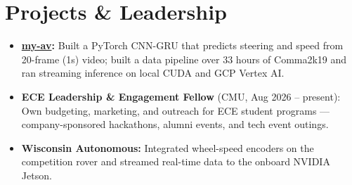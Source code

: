 \documentclass[11pt, letterpaper]{article}
\begin{document}
\section{Projects \& Leadership}
\begin{itemize}
  \item \textbf{\href{https://github.com/lordphone/my-av}{my-av}:} Built a PyTorch CNN-GRU that predicts steering and speed from 20-frame (1s) video; built a data pipeline over 33 hours of Comma2k19 and ran streaming inference on local CUDA and GCP Vertex AI.
  \item \textbf{ECE Leadership \& Engagement Fellow} (CMU, Aug 2026 -- present): Own budgeting, marketing, and outreach for ECE student programs --- company-sponsored hackathons, alumni events, and tech event outings.
  \item \textbf{Wisconsin Autonomous:} Integrated wheel-speed encoders on the competition rover and streamed real-time data to the onboard NVIDIA Jetson.
\end{itemize}
\end{document}
